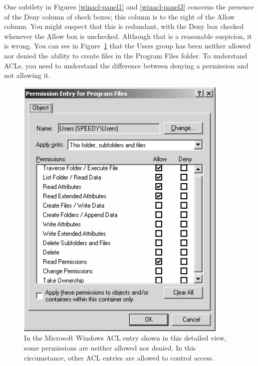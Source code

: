 One subtlety in Figures \ref{winacl-panel1} and \ref{winacl-panel3}
concerns the presence of the Deny column of check boxes; this column is to the right of
the Allow column.  You might suspect that this is redundant, with the
Deny box checked whenever the Allow box is unchecked.  Although that
is a reasonable suspicion, it is wrong.  You can see in
Figure~\ref{winacl-panel3b} that the Users group has been neither
allowed nor denied the ability to create files in the Program Files
folder.  To understand ACLs, you need to understand the
difference between denying a permission and not allowing it.
\begin{figure}
\centerline{\includegraphics{hail_f0716}}
\caption{In the  Microsoft Windows ACL entry shown in this detailed view, some
  permissions are neither allowed nor denied.  In this circumstance,
  other ACL entries are allowed to control access.}
\label{winacl-panel3b}
\end{figure}

